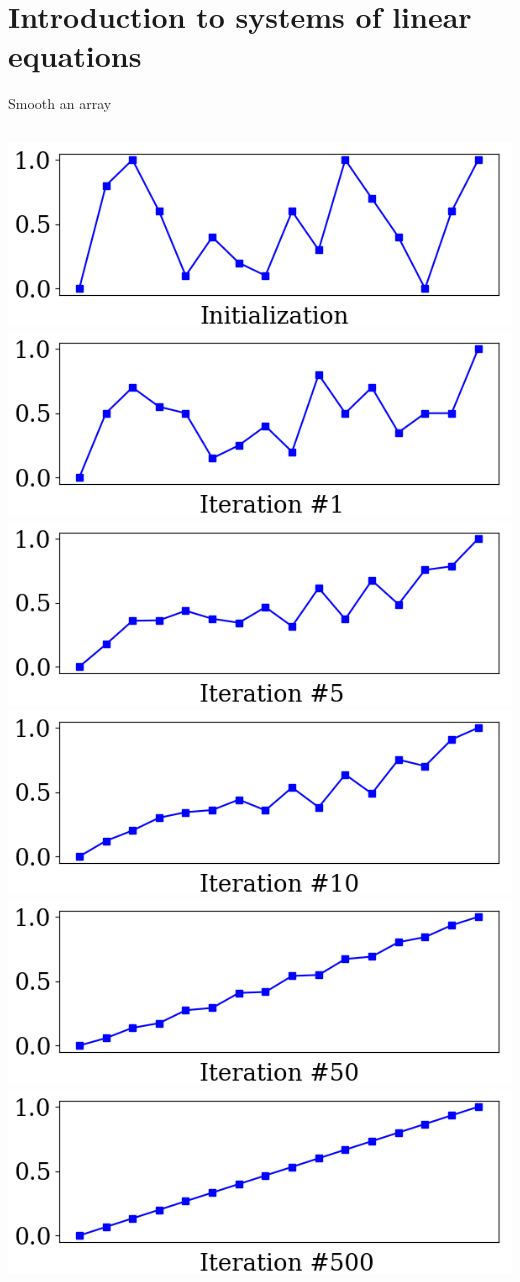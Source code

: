 \documentclass[UKenglish,aspectratio=169]{beamer}
\begin{document}
\section{Introduction to systems of linear equations}

\begin{frame}[fragile]{Smooth an array}
\inputminted[frame=single]{python}{listings/example_3.1.py}
\includegraphics[width=.32\linewidth]{../manuscript/img/example_3_1_0.png}
\pause
\includegraphics[width=.32\linewidth]{../manuscript/img/example_3_1_1.png}
\pause                                
\includegraphics[width=.32\linewidth]{../manuscript/img/example_3_1_2.png}
\pause                                
\includegraphics[width=.32\linewidth]{../manuscript/img/example_3_1_3.png}
\pause                                
\includegraphics[width=.32\linewidth]{../manuscript/img/example_3_1_4.png}
\pause                                
\includegraphics[width=.32\linewidth]{../manuscript/img/example_3_1_5.png}
\end{frame}
\end{document}
